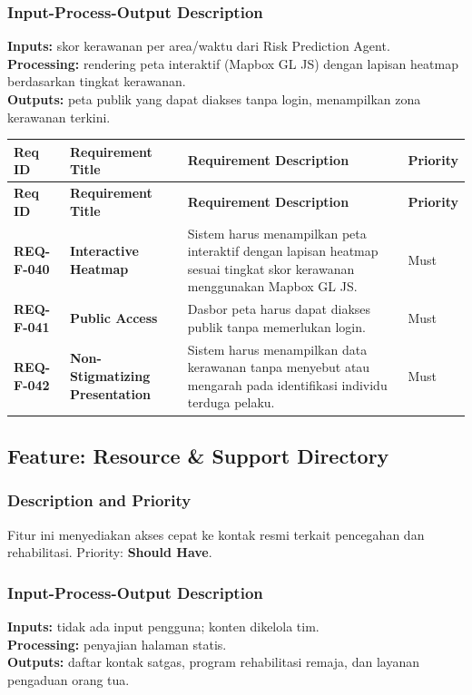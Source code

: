 \documentclass[11pt,a4paper]{article}
\newcommand{\req}[4]{\textbf{#1} & \textbf{#2} & #3 & #4 \\ \hline}
\begin{document}
\subsubsection{Input-Process-Output Description}
\textbf{Inputs:} skor kerawanan per area/waktu dari Risk Prediction Agent.\\
\textbf{Processing:} rendering peta interaktif (Mapbox GL JS) dengan lapisan heatmap berdasarkan tingkat kerawanan.\\
\textbf{Outputs:} peta publik yang dapat diakses tanpa login, menampilkan zona kerawanan terkini.

\begin{longtable}{|L{2.3cm}|L{4.0cm}|L{6.9cm}|L{1.6cm}|}
\hline
{}\textbf{Req ID} & \textbf{Requirement Title} & \textbf{Requirement Description} & \textbf{Priority} \\ \hline
\endfirsthead
\hline
{}\textbf{Req ID} & \textbf{Requirement Title} & \textbf{Requirement Description} & \textbf{Priority} \\ \hline
\endhead
\req{REQ-F-040}{Interactive Heatmap}{Sistem harus menampilkan peta interaktif dengan lapisan heatmap sesuai tingkat skor kerawanan menggunakan Mapbox GL JS.}{Must}
\req{REQ-F-041}{Public Access}{Dasbor peta harus dapat diakses publik tanpa memerlukan login.}{Must}
\req{REQ-F-042}{Non-Stigmatizing Presentation}{Sistem harus menampilkan data kerawanan tanpa menyebut atau mengarah pada identifikasi individu terduga pelaku.}{Must}
\end{longtable}

\subsection{Feature: Resource \& Support Directory}
\subsubsection{Description and Priority}
Fitur ini menyediakan akses cepat ke kontak resmi terkait pencegahan dan rehabilitasi. Priority: \textbf{Should Have}.

\subsubsection{Input-Process-Output Description}
\textbf{Inputs:} tidak ada input pengguna; konten dikelola tim.\\
\textbf{Processing:} penyajian halaman statis.\\
\textbf{Outputs:} daftar kontak satgas, program rehabilitasi remaja, dan layanan pengaduan orang tua.
\end{document}
